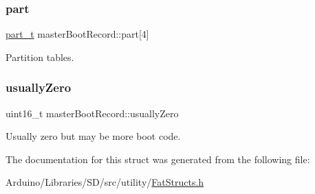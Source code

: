 \subsubsection{\texorpdfstring{part}{part}}
{\footnotesize\ttfamily \hyperlink{_fat_structs_8h_a37251e7d5c69a159be727a3fc8c9d0e6}{part\+\_\+t} master\+Boot\+Record\+::part\mbox{[}4\mbox{]}}

Partition tables. \mbox{\label{structmaster_boot_record_afacfc863e98f64053cd9459c6dec948f}} 
\subsubsection{\texorpdfstring{usually\+Zero}{usuallyZero}}
{\footnotesize\ttfamily uint16\+\_\+t master\+Boot\+Record\+::usually\+Zero}

Usually zero but may be more boot code. 

The documentation for this struct was generated from the following file\+:\begin{DoxyCompactItemize}
\item 
Arduino/\+Libraries/\+S\+D/src/utility/\hyperlink{_fat_structs_8h}{Fat\+Structs.\+h}\end{DoxyCompactItemize}
